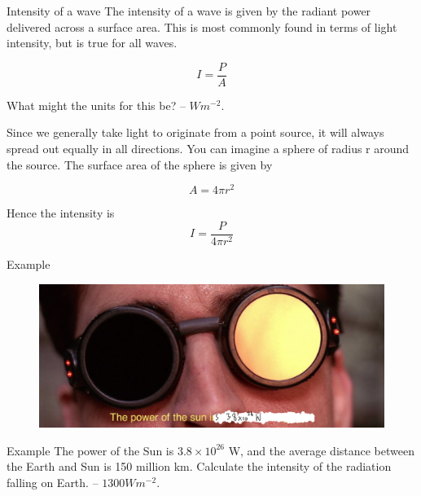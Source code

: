 \documentclass[../Main.tex]{subfiles}
\begin{document}
\begin{frame}{Intensity of a wave}
    The intensity of a wave is given by the radiant power delivered across a surface area. This is most commonly found in terms of light intensity, but is true for all waves.
    
    \begin{equation*}
        I = \frac{P}{A}
    \end{equation*}
    
    What might the units for this be? \pause
    -- $Wm^{-2}$. \newline
    
    Since we generally take light to originate from a point source, it will always spread out equally in all directions. You can imagine a sphere of radius r around the source. The surface area of the sphere is given by 
    
    \begin{equation*}
        A = 4\pi r^2
    \end{equation*}
    
    Hence the intensity is \begin{equation*}
        I = \frac{P}{4\pi r^2}
    \end{equation*}
\end{frame}

\begin{frame}{Example}
\begin{figure}
    \centering
    \includegraphics[width=\textwidth]{Waves_Images/powerofthesun.png}
\end{figure}
    \begin{exampleblock}{Example}
    The power of the Sun is $3.8\times 10^{26}$ W, and the average distance between the Earth and Sun is 150 million km. Calculate the intensity of the radiation falling on Earth. \pause
    -- $1300 Wm^{-2}$.
    \end{exampleblock}
\end{frame}
\end{document}
